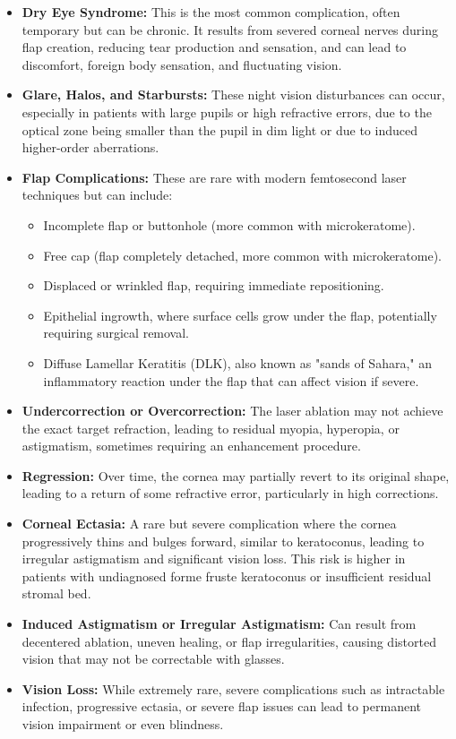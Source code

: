 \begin{itemize}
  \item \textbf{Dry Eye Syndrome:} This is the most common complication, often temporary but can be chronic. It results from severed corneal nerves during flap creation, reducing tear production and sensation, and can lead to discomfort, foreign body sensation, and fluctuating vision.
  
  \item \textbf{Glare, Halos, and Starbursts:} These night vision disturbances can occur, especially in patients with large pupils or high refractive errors, due to the optical zone being smaller than the pupil in dim light or due to induced higher-order aberrations.
  
  \item \textbf{Flap Complications:} These are rare with modern femtosecond laser techniques but can include:
    \begin{itemize}
      \item Incomplete flap or buttonhole (more common with microkeratome).
      \item Free cap (flap completely detached, more common with microkeratome).
      \item Displaced or wrinkled flap, requiring immediate repositioning.
      \item Epithelial ingrowth, where surface cells grow under the flap, potentially requiring surgical removal.
      \item Diffuse Lamellar Keratitis (DLK), also known as "sands of Sahara," an inflammatory reaction under the flap that can affect vision if severe.
    \end{itemize}
  
  \item \textbf{Undercorrection or Overcorrection:} The laser ablation may not achieve the exact target refraction, leading to residual myopia, hyperopia, or astigmatism, sometimes requiring an enhancement procedure.
  
  \item \textbf{Regression:} Over time, the cornea may partially revert to its original shape, leading to a return of some refractive error, particularly in high corrections.
  
  \item \textbf{Corneal Ectasia:} A rare but severe complication where the cornea progressively thins and bulges forward, similar to keratoconus, leading to irregular astigmatism and significant vision loss. This risk is higher in patients with undiagnosed forme fruste keratoconus or insufficient residual stromal bed.
  
  \item \textbf{Induced Astigmatism or Irregular Astigmatism:} Can result from decentered ablation, uneven healing, or flap irregularities, causing distorted vision that may not be correctable with glasses.
  
  \item \textbf{Vision Loss:} While extremely rare, severe complications such as intractable infection, progressive ectasia, or severe flap issues can lead to permanent vision impairment or even blindness.
\end{itemize}

